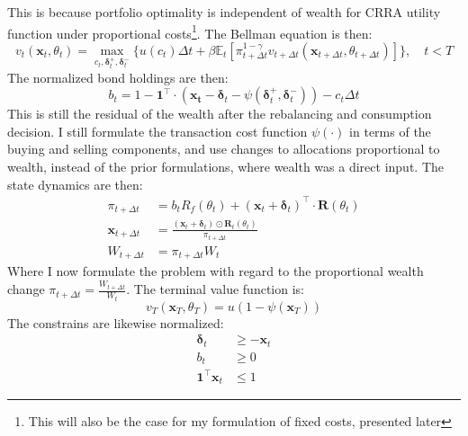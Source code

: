 \documentclass[11pt]{article}
\begin{document}
This is because portfolio optimality is independent of wealth for CRRA utility function under proportional costs\footnote{This will also be the case for my formulation of fixed costs, presented later}. 
The Bellman equation is then:
\begin{equation} \label{eq: class_bellman}
  v_{t} (\mathbf{x}_{t}, \theta_t) = \max_{c_t , \boldsymbol{\delta}^{+}_{t}, \boldsymbol{\delta}^{-}_{t} } \{ u(c_t) 
  \Delta t + \beta \mathbb{E}_{t} \left[ 
    \pi_{t+\Delta t}^{1-\gamma}
    v_{t+\Delta t} (\mathbf{x}_{t+\Delta t }, \theta_{t + \Delta t }  ) 
    \right] \} , \quad t < T 
\end{equation}
The normalized bond holdings are then:
\begin{equation}\label{eq: class_bond_holdings}
  b_{t} = 1 - \mathbf{1}^{\top} \cdot (\mathbf{x_t} - \boldsymbol{\delta}_t - \psi( \boldsymbol{\delta}^{+}_{t}, \boldsymbol{\delta}^{-}_{t}  )) - c_t \Delta t
\end{equation}
This is still the residual of the wealth after the rebalancing and consumption decision.
I still formulate the transaction cost function $\psi(\cdot)$ in terms of the buying and selling components,
and use changes to allocations proportional to wealth, instead of the prior formulations, where wealth was a direct input.
The state dynamics are then:
\begin{align}
  \pi_{t+\Delta t} &= b_t R_f (\theta_t)  + (\mathbf{x}_t + \boldsymbol{\delta}_t)^{\top} \cdot \mathbf{R}(\theta_t) \\
  \mathbf{x}_{t+\Delta t} &=  \frac{(\mathbf{x}_t + \boldsymbol{\delta}_t) \odot \mathbf{R}_t (\theta_t )}{ \pi_{t+\Delta t} } \\
  W_{t+\Delta t} &= \pi_{t+\Delta t} W_t
\end{align}
Where I now formulate the problem with regard to the proportional wealth change $\pi_{t+\Delta t} = \frac{W_{t+\Delta t}}{W_t}$.
The terminal value function is:
\begin{equation} \label{eq: class_terminal_value}
  v_T (\mathbf{x}_T , \theta_T ) = u (1 - \psi(\mathbf{x}_T)) 
\end{equation}
The constrains are likewise normalized:
\begin{align}
  \boldsymbol{\delta}_t &\geq - \mathbf{x}_t \label{eq: No_Short_risky} \\
  b_t &\geq 0 \label{eq: No_Short_bonds}\\
  \mathbf{1}^{\top} \mathbf{x}_t &\leq 1 \label{eq: No_Geared_Risky}
\end{align}
\end{document}
